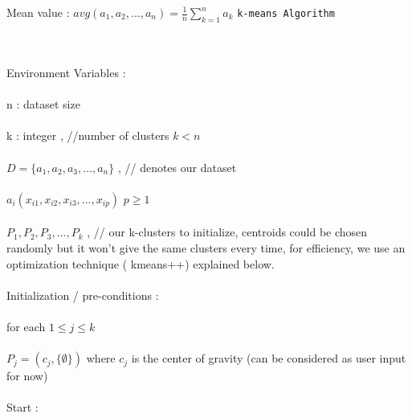 \documentclass[a4paper]{letter}
\begin{document}
\begin{flushleft}
{Mean value : $\displaystyle avg(a_1,a_2,...,a_n) = \frac{1}{n}\sum_{k=1}^{n}a_k$
 }
\clearpage
\centering
\texttt{\LARGE  k-means Algorithm  }
\begin{flushleft}
\textsf{\\ \ \\ \Large  Environment Variables :} \textsf{\\ \ \\ \large n :  dataset size \\ \ \\ \large k : integer  , \hspace*{0.5cm} //number of clusters $k< n$\\ \ \\
 $D = \{ a_1 , a_2 , a_3 , ... , a_n \}$ ,  // denotes our dataset \\ \ \\  
 $a_i(x_{i1} , x_{i2} , x_{i3}  , ... , x_{ip})$ \hspace*{0.3cm} $p \geq 1$
 \\ \ \\ 
  $  P_1 , P_2 , P_3 , ... , P_k$ , // our k-clusters to initialize, centroids could be chosen randomly but it won't give the same clusters every time, for efficiency, we use an optimization technique  ( kmeans++) explained below.
\textsf{\\ \ \\ \Large  Initialization / pre-conditions : \\ \ \\  }
\textsf{
	\large for each $1 \leq j \leq k$ \\ \ \\ $P_j = (c_j,\{\emptyset\})$ where $c_j$ is the center of gravity (can be considered as user input for now)}
 }
\textsf{\\ \ \\ \Large  Start : \\ \ \\  }


\end{flushleft}
\end{flushleft}
\end{document}
